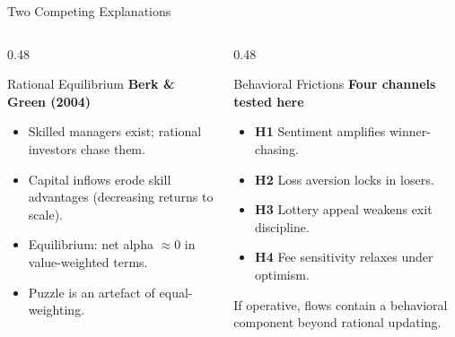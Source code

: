 \documentclass[10pt, aspectratio=169]{beamer}
\begin{document}
\begin{frame}{Two Competing Explanations}
  \begin{columns}[T]
    \begin{column}{0.48\textwidth}
      \begin{block}{Rational Equilibrium}
        \textbf{Berk \& Green (2004)}
        \begin{itemize}\itemsep2pt
          \item Skilled managers exist; rational investors chase them.
          \item Capital inflows erode skill advantages (decreasing returns to scale).
          \item Equilibrium: net alpha $\approx 0$ in value-weighted terms.
          \item Puzzle is an artefact of equal-weighting.
        \end{itemize}
      \end{block}
    \end{column}
    \begin{column}{0.48\textwidth}
      \begin{block}{Behavioral Frictions}
        \textbf{Four channels tested here}
        \begin{itemize}\itemsep2pt
          \item \textbf{H1} Sentiment amplifies winner-chasing.
          \item \textbf{H2} Loss aversion locks in losers.
          \item \textbf{H3} Lottery appeal weakens exit discipline.
          \item \textbf{H4} Fee sensitivity relaxes under optimism.
        \end{itemize}
        \footnotesize If operative, flows contain a behavioral component
        beyond rational updating.
      \end{block}
    \end{column}
  \end{columns}
\end{frame}
\end{document}
